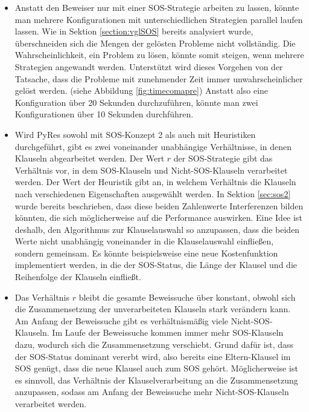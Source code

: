 	\begin{itemize}
		\item Anstatt den Beweiser nur mit einer SOS-Strategie arbeiten zu lassen, könnte man mehrere Konfigurationen mit unterschiedlichen Strategien parallel laufen lassen. Wie in Sektion \ref{section:vglSOS} bereits analysiert wurde, überschneiden sich die Mengen der gelösten Probleme nicht vollständig. Die Wahrscheinlichkeit, ein Problem zu lösen, könnte somit steigen, wenn mehrere Strategien angewandt werden.
		Unterstützt wird dieses Vorgehen von der Tatsache, dass die Probleme mit zunehmender Zeit immer unwahrscheinlicher gelöst werden. (siehe Abbildung \ref{fig:timecomapre}) Anstatt also eine Konfiguration über 20 Sekunden durchzuführen, könnte man zwei Konfigurationen über 10 Sekunden durchführen.
		\item Wird PyRes sowohl mit SOS-Konzept 2 als auch mit Heuristiken durchgeführt, gibt es zwei voneinander unabhängige Verhältnisse, in denen Klauseln abgearbeitet werden. Der Wert $r$ der SOS-Strategie gibt das Verhältnis vor, in dem SOS-Klauseln und Nicht-SOS-Klauseln verarbeitet werden. Der Wert der Heuristik gibt an, in welchem Verhältnis die Klauseln nach verschiedenen Eigenschaften ausgewählt werden. In Sektion \ref{sec:sos2} wurde bereits beschrieben, dass diese beiden Zahlenwerte Interferenzen bilden könnten, die sich möglicherweise auf die Performance auswirken. Eine Idee ist deshalb, den Algorithmus zur Klauselauswahl so anzupassen, dass die beiden Werte nicht unabhängig voneinander in die Klauselauswahl einfließen, sondern gemeinsam. Es könnte beispielsweise eine neue Kostenfunktion implementiert werden, in die der SOS-Status, die Länge der Klausel und die Reihenfolge der Klauseln einfließt.
		\item Das Verhältnis $r$ bleibt die gesamte Beweissuche über konstant, obwohl sich die Zusammensetzung der unverarbeiteten Klauseln stark verändern kann. Am Anfang der Beweissuche gibt es verhältnismäßig viele Nicht-SOS-Klauseln. Im Laufe der Beweissuche kommen immer mehr SOS-Klauseln dazu, wodurch sich die Zusammensetzung verschiebt. Grund dafür ist, dass der SOS-Status dominant vererbt wird, also bereits eine Eltern-Klausel im SOS genügt, dass die neue Klausel auch zum SOS gehört. Möglicherweise ist es sinnvoll, das Verhältnis der Klauselverarbeitung an die Zusammensetzung anzupassen, sodass am Anfang der Beweissuche mehr Nicht-SOS-Klauseln verarbeitet werden.
	\end{itemize}

